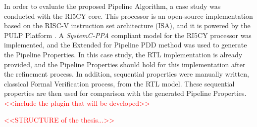 In order to evaluate the proposed Pipeline Algorithm, a case study was conducted with the RI5CY core. This processor is an open-source implementation based on the RISC-V instruction set architecture (ISA), and it is powered by the PULP Platform \cite{pulp}. A \textit{SystemC-PPA} compliant model for the RI5CY processor was implemented, and the Extended for Pipeline PDD method was used to generate the Pipeline Properties. In this case study, the RTL implementation is already provided, and the Pipeline Properties should hold for this implementation after the refinement process. In addition, sequential properties were manually written, classical Formal Verification process, from the RTL model. These sequential properties are then used for comparison with the generated Pipeline Properties. \textcolor{red}{<<include the plugin that will be developed>>}


\textcolor{red}{<<STRUCTURE of the thesis...>>}
